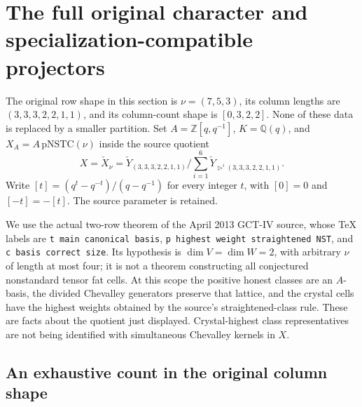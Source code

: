 \section{The full original character and specialization-compatible projectors}
\label{sec:gct-full-character}

The original row shape in this section is $\nu=(7,5,3)$, its column
lengths are $(3,3,3,2,2,1,1)$, and its column-count shape is
$[0,3,2,2]$. None of these data is replaced by a smaller partition.
Set $A=\mathbb Z[q,q^{-1}]$, $K=\mathbb Q(q)$, and
$X_A=A\,\mathrm{pNSTC}(\nu)$ inside the source quotient
\[
 X=\check X_\nu=\check Y_{(3,3,3,2,2,1,1)}/
 \sum_{i=1}^{6}\check Y_{\triangleright^i(3,3,3,2,2,1,1)}.
\]
Write $[t]=(q^t-q^{-t})/(q-q^{-1})$ for every integer $t$,
with $[0]=0$ and $[-t]=-[t]$. The source parameter is retained.

We use the actual two-row theorem of the April 2013 GCT-IV source,
whose TeX labels are \texttt{t main canonical basis},
\texttt{p highest weight straightened NST}, and
\texttt{c basis correct size}. Its hypothesis is
$\dim V=\dim W=2$, with arbitrary $\nu$ of length at most four;
it is not a theorem constructing all conjectured nonstandard tensor
fat cells. At this scope the positive honest classes are an $A$-basis,
the divided Chevalley generators preserve that lattice, and the
crystal cells have the highest weights obtained by the source's
straightened-class rule. These are facts about the quotient just
displayed. Crystal-highest class representatives are not being
identified with simultaneous Chevalley kernels in $X$.

\subsection{An exhaustive count in the original column shape}


